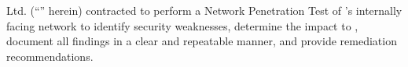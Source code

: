 \qquad\enterpriseName Ltd. (“\enterpriseName” herein) contracted \brandName to perform a Network Penetration Test of
\enterpriseName’s internally facing network to identify security weaknesses, determine the impact to \enterpriseName,
document all findings in a clear and repeatable manner, and provide remediation recommendations.
